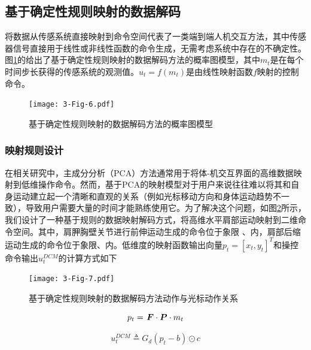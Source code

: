 \subsection{基于确定性规则映射的数据解码}
将数据从传感系统直接映射到命令空间代表了一类端到端人机交互方法，其中传感器信号直接用于线性或非线性函数的命令生成，无需考虑系统中存在的不确定性。图\ref{3-fig-6}的给出了基于确定性规则映射的数据解码方法的概率图模型，其中${m_t}$是在每个时间步长获得的传感系统的观测值。${{u}_t} = f({{m}_t})$是由线性映射函数$f$映射的控制命令。

\begin{figure}[!t]
    \centering
    \texttt{[image: 3-Fig-6.pdf]}
    \caption{基于确定性规则映射的数据解码方法的概率图模型}
    \label{3-fig-6}
\end{figure} 

\subsubsection{映射规则设计}
在相关研究中，主成分分析（PCA）方法通常用于将体-机交互界面的高维数据映射到低维操作命令\cite{casadioBodyMachineInterface2011,seanez-gonzalezStaticDynamicDecoding2017}。然而，基于PCA的映射模型对于用户来说往往难以将其和自身运动建立起一个清晰和直观的关系（例如光标移动方向和身体运动趋势不一致），导致用户需要大量的时间才能熟练使用它。为了解决这个问题，如图\ref{3-fig-7}所示，我们设计了一种基于规则的数据映射解码方式，将高维水平肩部运动映射到二维命令空间。其中，肩胛胸壁关节进行前伸运动生成的命令位于象限 \uppercase\expandafter{}、\uppercase\expandafter{}内，肩部后缩运动生成的命令位于象限\uppercase\expandafter{}、\uppercase\expandafter{}内。低维度的映射函数输出向量${p_t} = {[{x_t},{y_t}]^T}$和操控命令输出$u_t^{DCM}$的计算方式如下

\begin{figure}[!t]
    \centering
    \texttt{[image: 3-Fig-7.pdf]}
    \caption{基于确定性规则映射的数据解码方法动作与光标动作关系}
    \label{3-fig-7}
\end{figure} 

\begin{equation}
\label{eq1}
{p_t} = {\kern 1pt} \boldsymbol{{F}} \cdot \boldsymbol{{P}} \cdot {m_t}
\end{equation}   

\begin{equation}
\label{eq2}
u_t^{DCM} \triangleq {G_d}\left( {{p_t} - b} \right) \odot c
\end{equation}   

